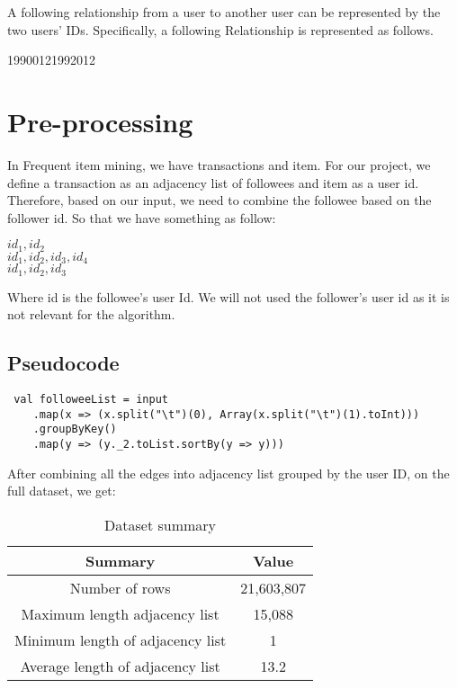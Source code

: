 \documentclass[11pt]{article}
\begin{document}
A following relationship from a user to another user can be represented by the two users' IDs.
Specifically, a following Relationship is represented as follows.

1990012\hspace{1cm}1992012

\section{Pre-processing}
In Frequent item mining, we have transactions and item.
For our project, we define a transaction as an adjacency list of followees and item as a user id.
Therefore, based on our input, we need to combine the followee based on the follower id.
So that we have something as follow: 

$id_1, id_2$ \\
$id_1, id_2, id_3, id_4$ \\
$id_1, id_2, id_3$

Where id is the followee's user Id.
We will not used the follower's user id as it is not relevant for the algorithm.

\subsection{Pseudocode}

\begin{lstlisting}
 val followeeList = input
    .map(x => (x.split("\t")(0), Array(x.split("\t")(1).toInt)))
    .groupByKey()
    .map(y => (y._2.toList.sortBy(y => y)))
\end{lstlisting}

After combining all the edges into adjacency list grouped by the user ID, on the full dataset, we get:

\begin{table}[h!]
    \centering
    \begin{tabular}{||c c||}
        \hline
        Summary & Value \\
        \hline\hline
        Number of rows & 21,603,807 \\
        Maximum length adjacency list & 15,088 \\
        Minimum length of adjacency list & 1 \\
        Average length of adjacency list & 13.2 \\
        \hline
    \end{tabular}
    \caption{Dataset summary}
    \label{table:1}
\end{table}
\end{document}
